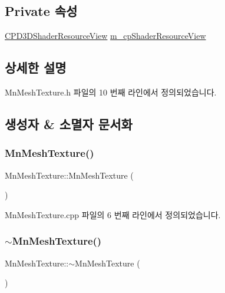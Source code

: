 \subsection*{Private 속성}
\begin{DoxyCompactItemize}
\item 
\hyperlink{namespace_m_n_l_a93794d93663474ff79c950ed985565aa}{C\+P\+D3\+D\+Shader\+Resource\+View} \hyperlink{class_m_n_l_1_1_mn_mesh_texture_ae2ad2b49f8b76a235dbcda292f6721d5}{m\+\_\+cp\+Shader\+Resource\+View}
\end{DoxyCompactItemize}


\subsection{상세한 설명}


Mn\+Mesh\+Texture.\+h 파일의 10 번째 라인에서 정의되었습니다.



\subsection{생성자 \& 소멸자 문서화}
\mbox{\label{class_m_n_l_1_1_mn_mesh_texture_ac29132ecef67120fbcb9f5f34abfe24a}} 
\subsubsection{\texorpdfstring{Mn\+Mesh\+Texture()}{MnMeshTexture()}}
{\footnotesize\ttfamily Mn\+Mesh\+Texture\+::\+Mn\+Mesh\+Texture (\begin{DoxyParamCaption}{ }\end{DoxyParamCaption})}



Mn\+Mesh\+Texture.\+cpp 파일의 6 번째 라인에서 정의되었습니다.

\mbox{\label{class_m_n_l_1_1_mn_mesh_texture_ae49980cf93b9164685c8c569335f16d8}} 
\subsubsection{\texorpdfstring{$\sim$\+Mn\+Mesh\+Texture()}{~MnMeshTexture()}}
{\footnotesize\ttfamily Mn\+Mesh\+Texture\+::$\sim$\+Mn\+Mesh\+Texture (\begin{DoxyParamCaption}{ }\end{DoxyParamCaption})}



